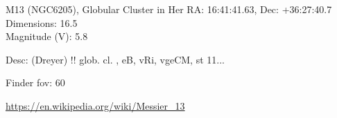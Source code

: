 \begin{block}{M13 (NGC6205), Globular Cluster in Her}
    RA: 16:41:41.63, Dec: +36:27:40.7 \\ 
    Dimensions: 16.5 \\ 
    Magnitude (V): 5.8


    Desc: (Dreyer) !! glob. cl. , eB, vRi, vgeCM, st 11... 

    Finder fov: 60 

    \url{https://en.wikipedia.org/wiki/Messier_13} 
\end{block}